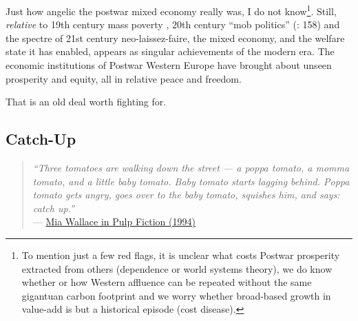 \documentclass[11pt,a4paper,oneside,openright]{article}
\begin{document}
Just how angelic the postwar mixed economy really was, I do not know\footnote{
	To mention just a few red flags, it is unclear what costs Postwar prosperity extracted from others (dependence or world systems theory), we do know whether or how Western affluence can be repeated without the same gigantuan carbon footprint and we worry whether broad-based growth in value-add is but a historical episode (cost disease).}. 
Still, \emph{relative} to 19th century mass poverty \citep{MarxEngels-1848-aa}, 20th century ``mob politics'' (\citealt{Crouch2004}: 158) and the spectre of 21st century neo-laissez-faire, the mixed economy, and the welfare state it has enabled, appears as singular achievements of the modern era. 
The economic institutions of Postwar Western Europe have brought about unseen prosperity and equity, all in relative peace and freedom. 

That is an old deal worth fighting for.

\subsection{Catch-Up}
\begin{quote}
	\emph{``Three tomatoes are walking down the street --- a poppa tomato, a momma tomato, and a little baby tomato. 
	Baby tomato starts lagging behind. 
	Poppa tomato gets angry, goes over to the baby tomato, squishes him, and says: catch up.''} \\
	--- \href{http://www.youtube.com/watch?v=5D_QKY0_Bxk}{Mia Wallace in Pulp Fiction (1994)}
\end{quote}



\end{document}
